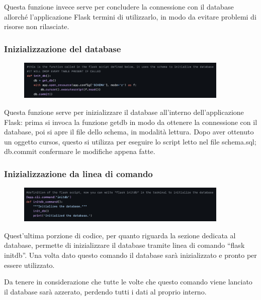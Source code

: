 \documentclass{article}
\begin{document}
Questa funzione invece serve per concludere la connessione con il database allorché l’applicazione Flask termini di utilizzarlo, in modo da evitare problemi di risorse non rilasciate.

\subsubsection{Inizializzazione del database}
\begin{figure}[H]
    \centering
    \includegraphics[width=0.9\textwidth]{images/inzializzazione_db.png}
\end{figure}

Questa funzione serve per inizializzare il database all’interno dell’applicazione Flask: prima si invoca la funzione get\textunderscore db in modo da ottenere la connessione con il database, poi si apre il file dello schema, in modalità lettura.
Dopo aver ottenuto un oggetto cursos, questo si utilizza per eseguire lo script letto nel file schema.sql; db.commit confermare le modifiche appena fatte.



\subsubsection{Inizializzazione da linea di comando}
\begin{figure}[H]
    \centering
    \includegraphics[width=0.9\textwidth]{images/inizializzazione_linea_comando.png}
\end{figure}

Quest’ultima porzione di codice, per quanto riguarda la sezione dedicata al database, permette di inizializzare il database tramite linea di comando “flask initdb”. 
Una volta dato questo comando il database sarà inizializzato e pronto per essere utilizzato.

Da tenere in considerazione che tutte le volte che questo comando viene lanciato il database sarà azzerato, perdendo tutti i dati al proprio interno.
\end{document}
